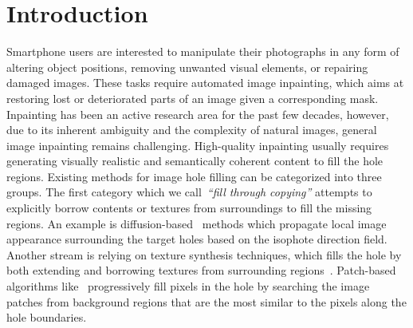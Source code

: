 \documentclass[oribibl]{llncs}  \usepackage[width=122mm,left=12mm,paperwidth=146mm,height=193mm,top=12mm,paperheight=217mm]{geometry}
\begin{document}
\section{Introduction}
Smartphone users are interested to manipulate their photographs in any form of altering object positions, removing unwanted visual elements, or repairing damaged images. These tasks require automated image inpainting, which aims at restoring lost or deteriorated parts of an image given a corresponding mask. Inpainting has been an active research area for the past few decades, however, due to its inherent ambiguity and the complexity of natural images, general image inpainting remains challenging. High-quality inpainting usually requires generating visually realistic and semantically coherent content to fill the hole regions. Existing methods for image hole filling can be categorized into three groups. The first category which we call~\emph{``fill through copying''} attempts to explicitly borrow contents or textures from surroundings to fill the missing regions. An example is diffusion-based~\cite{ballester2001filling,bertalmio2000image} methods which propagate local image appearance surrounding the target holes based on the isophote direction field. Another stream is relying on texture synthesis techniques, which fills the hole by both extending and borrowing textures from surrounding regions~\cite{criminisi2004region, drori2003fragment, he2012statistics, wilczkowiak2005hole, xu2010image}. Patch-based algorithms like~\cite{drori2003fragment,efros2001image,efros1999texture,wilczkowiak2005hole} progressively fill pixels in the hole by searching the image patches from background regions that are the most similar to the pixels along the hole boundaries.
\end{document}
